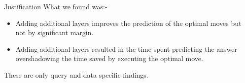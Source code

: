 \begin{frame}{Justification}
    What we found was:-
    \begin{itemize}
        \item Adding additional layers improves the prediction of the optimal moves but not by significant margin.
        \item Adding additional layers resulted in the time spent predicting the answer overshadowing the time saved by executing the optimal move.
    \end{itemize}
These are only query and data specific findings.
\end{frame}

